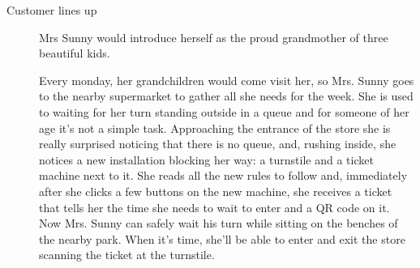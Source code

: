 \begin{description}
    \item[Customer lines up]
    Mrs Sunny would introduce herself as the proud grandmother of three beautiful kids.
         
    Every monday, her grandchildren would come visit her, so  Mrs. Sunny goes to the nearby supermarket to gather all she needs for the week. She is used to waiting for her turn standing outside in a queue and for someone of her age it's not a simple task. Approaching the entrance of the store she is really surprised noticing that there is no queue, and, rushing inside, she notices a new installation blocking her way: a turnstile and a ticket machine next to it. She reads all the new rules to follow and, immediately after she clicks a few buttons on the new machine, she receives a ticket that tells her the time she needs to wait to enter and a QR code on it. Now Mrs. Sunny can safely wait his turn while sitting on the benches of the nearby park. When it’s time, she'll be able to enter and exit the store scanning the ticket at the turnstile.



\end{description}
